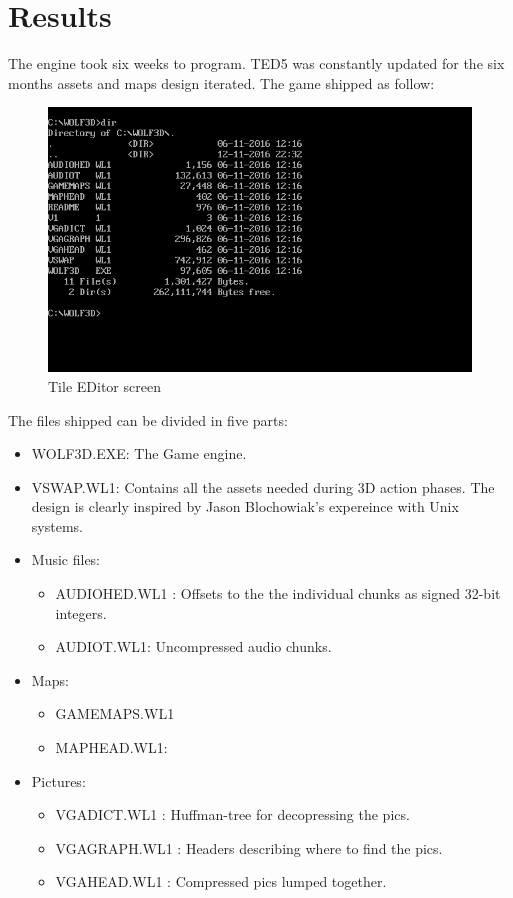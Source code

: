 \documentclass[book.tex]{subfiles}
\begin{document}
\section{Results}
The engine took six weeks to program. TED5 was constantly updated for the six months assets and maps design iterated. The game shipped as follow:
 \begin{figure}[H]
\centering
 \includegraphics[width=\textwidth]{imgs/result.png}
 \caption{Tile EDitor screen} 
  \end{figure}
  \par
 The files shipped can be divided in five parts:
 \begin{itemize}
 \item WOLF3D.EXE: The Game engine.
 \item VSWAP.WL1: Contains all the assets needed during 3D action phases. The design is clearly inspired by Jason Blochowiak's expereince with Unix systems.
 \item Music files:
     \begin{itemize}
     \item AUDIOHED.WL1 : Offsets to the the individual chunks as signed 32-bit integers.
     \item AUDIOT.WL1: Uncompressed audio chunks. 
     \end{itemize}
\item Maps:
     \begin{itemize}
      \item GAMEMAPS.WL1 
      \item MAPHEAD.WL1: 
      \end{itemize}
\item Pictures:
    \begin{itemize} 
     \item VGADICT.WL1 : Huffman-tree for decopressing the pics.
     \item VGAGRAPH.WL1 : Headers describing where to find the pics.
     \item VGAHEAD.WL1 : Compressed pics lumped together.
     \end{itemize}
\end{itemize}
 \par
\end{document}
